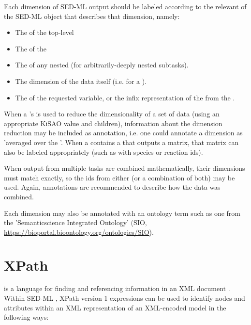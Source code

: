 Each dimension of SED-ML \RepeatedTask output should be labeled according to the relevant  of the SED-ML object that describes that dimension, namely:

\begin{itemize}
    \item The  of the top-level \RepeatedTask
    \item The  of the \SubTask
    \item The  of any nested \SubTask (for arbitrarily-deeply nested subtasks).
    \item The dimension of the data itself (i.e.  for a \UniformTimeCourse).
    \item The  of the requested variable, or the infix representation of the \Math from the \DataGenerator.
\end{itemize}

When a \Variable's  is used to reduce the dimensionality of a set of data (using an appropriate KiSAO value and \AppliedDimension children), information about the dimension reduction may be included as annotation, i.e. one could annotate a \SubTask dimension as 'averaged over the \RepeatedTask \element{[id]}'.  When a \DataGenerator contains a \Variable that outputs a matrix, that matrix can also be labeled appropriately (such as with species or reaction ids).

When output from multiple tasks are combined mathematically, their dimensions must match exactly, so the ids from either (or a combination of both) may be used.  Again, annotations are recommended to describe how the data was combined.

Each dimension may also be annotated with an ontology term such as one from the 'Semanticscience Integrated Ontology' (SIO, \url{https://bioportal.bioontology.org/ontologies/SIO}).


\section{XPath}  
\label{sec:xpath}
 is a language for finding and referencing information in an XML document \citep{xpath:1999}. Within SED-ML \currentLV, XPath version 1 expressions can be used to identify nodes and attributes within an XML representation of an XML-encoded model in the following ways:

